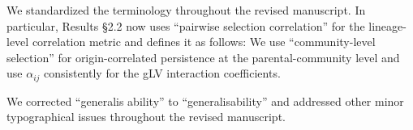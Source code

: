 
We standardized the terminology throughout the revised manuscript. In particular, Results \S2.2 now uses ``pairwise selection correlation'' for the lineage-level correlation metric and defines it as follows:
We use ``community-level selection'' for origin-correlated persistence at the parental-community level and use $\alpha_{ij}$ consistently for the gLV interaction coefficients.


We corrected ``generalis ability'' to ``generalisability'' and addressed other minor typographical issues throughout the revised manuscript.
